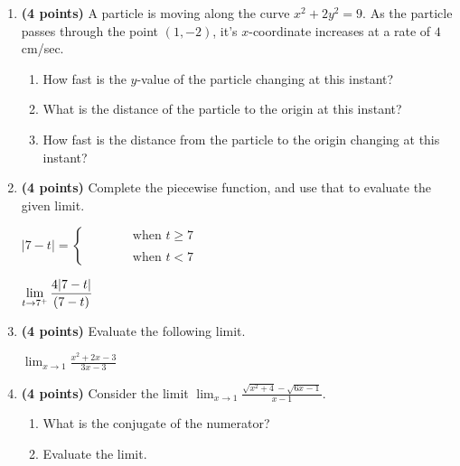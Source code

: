 \documentclass[12pt]{amsart}
\begin{document}
\begin{enumerate}
\vspace{2cm}
\newpage\def \b{2}\def \x{1}\def \y{-2}\def \xchange{4}\def \ratrhs{-2}\def \cirrhs{9}\def \hyprhs{-7}\def \compy{2y^{2}}\def \ychangenum{-8}\def \dist{5}\def \fracrat{-24}\def \fraccirc{4}\def \frachyp{12}
\item {\bf (4 points)} 
 A particle is moving along the curve $x^2 + \compy = \cirrhs$. As the particle passes through the point $(\x,\y)$, it's $x$-coordinate increases at a rate of $\xchange$cm/sec. \begin{enumerate}
\item How fast is the $y$-value of the particle changing at this instant? \vfill
\item What is the distance of the particle to the origin at this instant? \vfill
\item How fast is the distance from the particle to the origin changing at this instant? \vfill
\end{enumerate}

\newpage\def \a{7}\def \k{4}\def \abstop{1}\def \ktop{1}
\item {\bf (4 points)} 
 Complete the piecewise function, and use that to evaluate the given limit.

\vspace{.5cm}

$|\a - t| = \begin{cases} \hspace{1cm} & \text{ when } t \geq \a \\ & \\ \hspace{1cm} & \text{ when } t < \a \end{cases}$

\vspace{.5cm}

$\displaystyle \lim_{t \rightarrow \a^+} \frac{\ifthenelse{\ktop=1}{\k}{}\ifthenelse{\abstop=1}{|\a-t|}{(\a-t)}}{\ifthenelse{\ktop=0}{\k}{}\ifthenelse{\abstop=0}{|\a-t|}{(\a-t)}}$

\vfill 
\def \a{1}\def \b{-3}\def \k{3}\def \fancyp{x^{2}+2x^{}-3}\def \simplep{3x^{}-3}\def \fancyreduced{4}\def \niceanstop{\frac{4}{3}}\def \niceansbottom{\frac{3}{4}}
\item {\bf (4 points)} 
 Evaluate the following limit. 

$\displaystyle \lim_{x\rightarrow \a} \frac{\fancyp}{\simplep}$

\vfill 
\newpage\def \a{1}\def \b{5}\def \ab{5}\def \c{4}\def \amb{-4}\def \ansroot{5}\def \firstroot{x^{2}+4}\def \secondroot{6x^{}-1}\def \porm{1}
\item {\bf (4 points)} 
 Consider the limit $\displaystyle \lim_{x \rightarrow \a} \frac{\sqrt{\firstroot} - \sqrt{\secondroot}}{x-\a}$. \begin{enumerate}
\item What is the conjugate of the numerator? \vspace{3cm}
\item Evaluate the limit.
\end{enumerate}


\end{enumerate}
\end{document}
